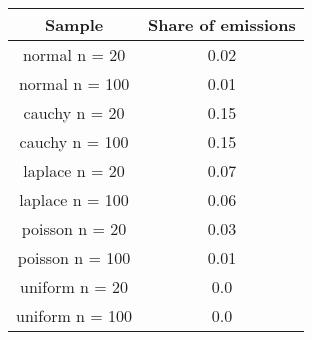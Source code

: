 \begin{tabular}{| c | c |} \hline Sample & Share of emissions \\ \hline normal n = 20 & 0.02 \\ \hline 
 normal n = 100 & 0.01 \\ \hline 
 cauchy n = 20 & 0.15 \\ \hline 
 cauchy n = 100 & 0.15 \\ \hline 
 laplace n = 20 & 0.07 \\ \hline 
 laplace n = 100 & 0.06 \\ \hline 
 poisson n = 20 & 0.03 \\ \hline 
 poisson n = 100 & 0.01 \\ \hline 
 uniform n = 20 & 0.0 \\ \hline 
 uniform n = 100 & 0.0 \\ \hline 
 \end{tabular}